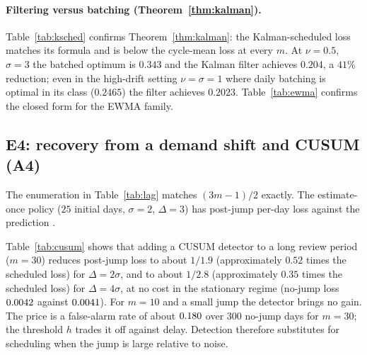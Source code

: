 \documentclass[11pt]{article}
\theoremstyle{definition}
\theoremstyle{remark}
\begin{document}
\begin{expsec}
\paragraph{Filtering versus batching (Theorem~\ref{thm:kalman}).}
\begin{table}[t]\centering\small
\caption{E3. $\nu=0.5$, $\sigma=3$, $\beta=1$ (no revision cost). Kalman-scheduled loss $[p+(m+1)\nu^2/2]/(8\beta)$ with $p=1.380$ against the cycle-mean loss of Theorem~\ref{thm:review}.}\label{tab:ksched}\end{table}
\begin{table}[t]\centering\small
\caption{E3. EWMA with gain $g$ (Proposition~\ref{prop:ewma}), $\nu=0.5$, $\sigma=3$; the minimum is at $g^*=0.153$ with loss $0.2038$.}\label{tab:ewma}\end{table}
Table~\ref{tab:ksched} confirms Theorem~\ref{thm:kalman}: the Kalman-scheduled loss matches its formula and is below the cycle-mean loss at every $m$. At $\nu=0.5$, $\sigma=3$ the batched optimum is $0.343$ and the Kalman filter achieves $0.204$, a $41\%$ reduction; even in the high-drift setting $\nu=\sigma=1$ where daily batching is optimal in its class ($0.2465$) the filter achieves $0.2023$. Table~\ref{tab:ewma} confirms the closed form for the EWMA family.

\subsection{E4: recovery from a demand shift and CUSUM (A4)}
\begin{table}[t]\centering\small
\caption{E4. Days until the toll is based solely on post-jump data, enumerated over \emph{every} jump offset in a cycle, noise-free (Proposition~\ref{prop:recovery}).}\label{tab:lag}\end{table}
The enumeration in Table~\ref{tab:lag} matches $(3m-1)/2$ exactly. The estimate-once policy ($25$ initial days, $\sigma=2$, $\Delta=3$) has post-jump per-day loss \EfourOnceSim{} against the prediction \EfourOncePred.
\begin{table}[t]\centering\small
\caption{A4. Change-point detection. Per-day loss over $300$ post-jump days ($\sigma=1$, no drift), $6{,}000$ paths per row, CUSUM with allowance $k=0.5\sigma$ and threshold $h=8\sigma$; after an alarm the planner waits $5$ days and re-estimates from them. Detection delay is measured from the jump, among detected jumps.}\label{tab:cusum}\end{table}
Table~\ref{tab:cusum} shows that adding a CUSUM detector to a long review period ($m=30$) reduces post-jump loss to about $1/1.9$ (approximately $0.52$ times the scheduled loss) for $\Delta=2\sigma$, and to about $1/2.8$ (approximately $0.35$ times the scheduled loss) for $\Delta=4\sigma$, at no cost in the stationary regime (no-jump loss $0.0042$ against $0.0041$). For $m=10$ and a small jump the detector brings no gain. The price is a false-alarm rate of about $0.180$ over $300$ no-jump days for $m=30$; the threshold $h$ trades it off against delay. Detection therefore substitutes for scheduling when the jump is large relative to noise.


\end{expsec}
\end{document}
